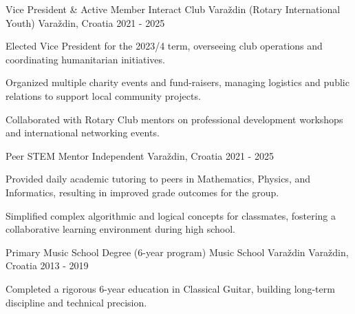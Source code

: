 

\begin{cventries}




  \cventry
    {Vice President \& Active Member} %
    {Interact Club Varaždin (Rotary International Youth)} %
    {Varaždin, Croatia} %
    {2021 - 2025} %
    {
      \begin{cvitems}
        \item {Elected Vice President for the 2023/4 term, overseeing club operations and coordinating humanitarian initiatives.}
        \item {Organized multiple charity events and fund-raisers, managing logistics and public relations to support local community projects.}
        \item {Collaborated with Rotary Club mentors on professional development workshops and international networking events.}
      \end{cvitems}
      \vspace{4mm}
    }

  \cventry
    {Peer STEM Mentor} %
    {Independent} %
    {Varaždin, Croatia} %
    {2021 - 2025} %
    {
      \begin{cvitems}
        \item {Provided daily academic tutoring to peers in Mathematics, Physics, and Informatics, resulting in improved grade outcomes for the group.}
        \item {Simplified complex algorithmic and logical concepts for classmates, fostering a collaborative learning environment during high school.}
      \end{cvitems}
      \vspace{4mm}
    }

  \cventry
    {Primary Music School Degree (6-year program)} %
    {Music School Varaždin} %
    {Varaždin, Croatia} %
    {2013 - 2019} %
    {
      \begin{cvitems}
        \item {Completed a rigorous 6-year education in Classical Guitar, building long-term discipline and technical precision.}
      \end{cvitems}
      \vspace{4mm}
    }

\end{cventries}

